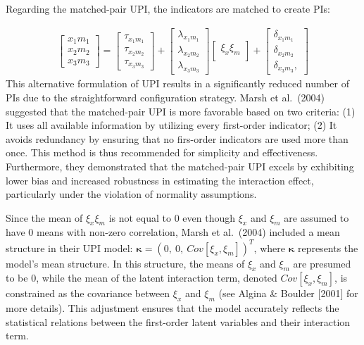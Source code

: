 \documentclass[
  man]{apa6}
\begin{document}
Regarding the matched-pair UPI, the indicators are matched to create PIs:

\begin{align}
    \begin{bmatrix}
        x_{1}m_{1} \\
        x_{2}m_{2} \\
        x_{3}m_{3}
    \end{bmatrix} =
    \begin{bmatrix}
        \tau_{x_{1}m_{1}} \\
        \tau_{x_{2}m_{2}} \\ 
        \tau_{x_{3}m_{3}}
    \end{bmatrix} + 
    \begin{bmatrix}
        \lambda_{x_{1}m_{1}} \\
        \lambda_{x_{2}m_{2}} \\ 
        \lambda_{x_{3}m_{3}} 
    \end{bmatrix}
    \begin{bmatrix}
        \xi_{x}\xi_{m} \\
    \end{bmatrix} +
    \begin{bmatrix}
        \delta_{x_{1}m_{1}} \\
        \delta_{x_{2}m_{2}} \\ 
        \delta_{x_{3}m_{3}},
    \end{bmatrix}
\end{align}
This alternative formulation of UPI results in a significantly reduced number of PIs due to the straightforward configuration strategy. Marsh et al.~(2004) suggested that the matched-pair UPI is more favorable based on two criteria: (1) It uses all available information by utilizing every first-order indicator; (2) It avoids redundancy by ensuring that no firs-order indicators are used more than once. This method is thus recommended for simplicity and effectiveness. Furthermore, they demonstrated that the matched-pair UPI excels by exhibiting lower bias and increased robustness in estimating the interaction effect, particularly under the violation of normality assumptions.

Since the mean of \(\xi_{x}\xi_{m}\) is not equal to 0 even though \(\xi_{x}\) and \(\xi_{m}\) are assumed to have 0 means with non-zero correlation, Marsh et al.~(2004) included a mean structure in their UPI model: \(\mathbf{\kappa} = (0,\ 0,\ Cov[\xi_{x}, \xi_{m}])^T\), where \(\mathbf{\kappa}\) represents the model's mean structure. In this structure, the means of \(\xi_{x}\) and \(\xi_{m}\) are presumed to be 0, while the mean of the latent interaction term, denoted \(Cov[\xi_{x}, \xi_{m}]\), is constrained as the covariance between \(\xi_{x}\) and \(\xi_{m}\) (see Algina \& Boulder {[}2001{]} for more details). This adjustment ensures that the model accurately reflects the statistical relations between the first-order latent variables and their interaction term.
\end{document}
